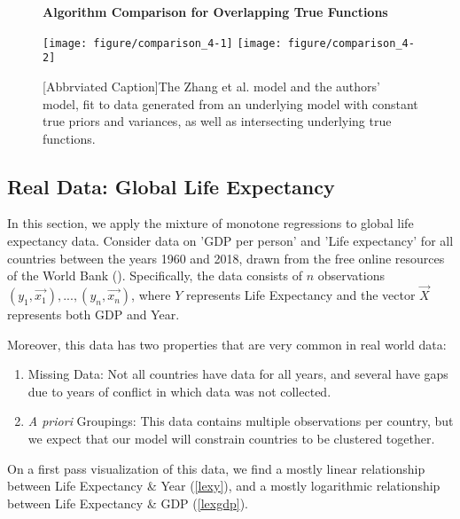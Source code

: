 \documentclass[10pt]{olplainarticle}\usepackage[]{graphicx}\usepackage[]{color}
\newenvironment{knitrout}{}{} %
\begin{document}
\begin{figure}[H]
\centering
    \textbf{Algorithm Comparison for Overlapping True Functions}\par\medskip
\begin{knitrout}
\color{fgcolor}

{\centering \texttt{[image: figure/comparison\_4-1]} 
\texttt{[image: figure/comparison\_4-2]} 

}



\end{knitrout}
[Abbrviated Caption]{The Zhang et al. model and the authors' model, fit to data generated from an underlying model with constant true priors and variances, as well as intersecting underlying true functions.} \label{fig:comparison_4}
\end{figure}



\subsection{Real Data: Global Life Expectancy }

In this section, we apply the mixture of monotone regressions to global life expectancy data. Consider data on 'GDP per person' and 'Life expectancy' for all countries between the years 1960 and 2018, drawn from the free online resources of the World Bank (\cite{worldbank}). Specifically, the data consists of $n$ observations $(y_1, \vec{x_1}),...,(y_n,\vec{x_n})$, where $Y$ represents Life Expectancy and the vector $\vec{X}$ represents both GDP and Year. 

Moreover, this data has two properties that are very common in real world data:
\begin{enumerate}[noitemsep] 
  \item Missing Data: Not all countries have data for all years, and several have gaps due to years of conflict in which data was not collected.
  \item \emph{A priori} Groupings: This data contains multiple observations per country, but we expect that our model will constrain countries to be clustered together. 
\end{enumerate}

On a first pass visualization of this data, we find a mostly linear relationship between Life Expectancy \& Year (\ref{lexy}), and a mostly logarithmic relationship between Life Expectancy \& GDP (\ref{lexgdp}). 
\end{document}

